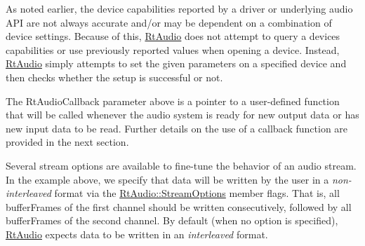 As noted earlier, the device capabilities reported by a driver or underlying audio A\+PI are not always accurate and/or may be dependent on a combination of device settings. Because of this, \hyperlink{class_rt_audio}{Rt\+Audio} does not attempt to query a device\textquotesingle{}s capabilities or use previously reported values when opening a device. Instead, \hyperlink{class_rt_audio}{Rt\+Audio} simply attempts to set the given parameters on a specified device and then checks whether the setup is successful or not.

The Rt\+Audio\+Callback parameter above is a pointer to a user-\/defined function that will be called whenever the audio system is ready for new output data or has new input data to be read. Further details on the use of a callback function are provided in the next section.

Several stream options are available to fine-\/tune the behavior of an audio stream. In the example above, we specify that data will be written by the user in a {\itshape non-\/interleaved} format via the \hyperlink{struct_rt_audio_1_1_stream_options}{Rt\+Audio\+::\+Stream\+Options} member {\ttfamily flags}. That is, all {\ttfamily buffer\+Frames} of the first channel should be written consecutively, followed by all {\ttfamily buffer\+Frames} of the second channel. By default (when no option is specified), \hyperlink{class_rt_audio}{Rt\+Audio} expects data to be written in an {\itshape interleaved} format. 